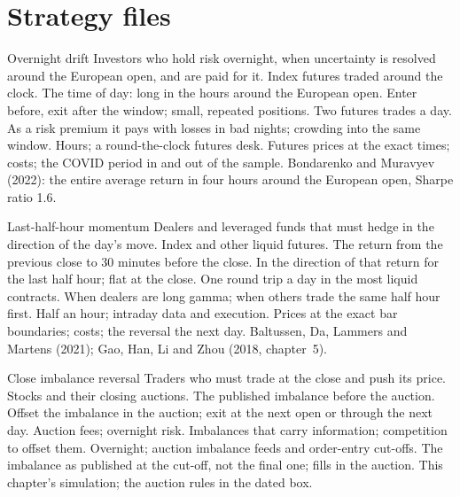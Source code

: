 \section{Strategy files}

\begin{strategyfile}{Overnight drift}\label{strat:s1:intraday-patterns:overnight}
 Investors who hold risk overnight, when uncertainty is resolved around the European open, and are paid for it.
 Index futures traded around the clock.
 The time of day: long in the hours around the European open.
 Enter before, exit after the window; small, repeated positions.
 Two futures trades a day.
 As a risk premium it pays with losses in bad nights; crowding into the same window.
 Hours; a round-the-clock futures desk.
 Futures prices at the exact times; costs; the COVID period in and out of the sample.
 Bondarenko and Muravyev (2022): the entire average return in four hours around the European open, Sharpe ratio 1.6.
\end{strategyfile}

\begin{strategyfile}{Last-half-hour momentum}\label{strat:s1:intraday-patterns:lasthalf}
 Dealers and leveraged funds that must hedge in the direction of the day's move.
 Index and other liquid futures.
 The return from the previous close to 30 minutes before the close.
 In the direction of that return for the last half hour; flat at the close.
 One round trip a day in the most liquid contracts.
 When dealers are long gamma; when others trade the same half hour first.
 Half an hour; intraday data and execution.
 Prices at the exact bar boundaries; costs; the reversal the next day.
 Baltussen, Da, Lammers and Martens (2021); Gao, Han, Li and Zhou (2018, chapter~5).
\end{strategyfile}

\begin{strategyfile}{Close imbalance reversal}\label{strat:s1:intraday-patterns:imbalance}
 Traders who must trade at the close and push its price.
 Stocks and their closing auctions.
 The published imbalance before the auction.
 Offset the imbalance in the auction; exit at the next open or through the next day.
 Auction fees; overnight risk.
 Imbalances that carry information; competition to offset them.
 Overnight; auction imbalance feeds and order-entry cut-offs.
 The imbalance as published at the cut-off, not the final one; fills in the auction.
 This chapter's simulation; the auction rules in the dated box.
\end{strategyfile}

